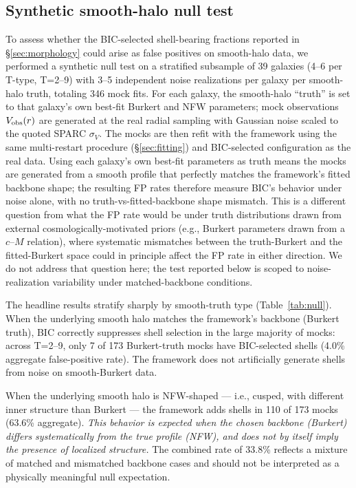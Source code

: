 \subsection{Synthetic smooth-halo null test}
\label{sec:null}

To assess whether the BIC-selected shell-bearing fractions reported in \S\ref{sec:morphology} could arise as false positives on smooth-halo data, we performed a synthetic null test on a stratified subsample of 39 galaxies (4--6 per T-type, T=2--9) with 3--5 independent noise realizations per galaxy per smooth-halo truth, totaling 346 mock fits. For each galaxy, the smooth-halo ``truth'' is set to that galaxy's own best-fit Burkert and NFW parameters; mock observations $V_{\rm obs}(r)$ are generated at the real radial sampling with Gaussian noise scaled to the quoted SPARC $\sigma_V$. The mocks are then refit with the framework using the same multi-restart procedure (\S\ref{sec:fitting}) and BIC-selected configuration as the real data. Using each galaxy's own best-fit parameters as truth means the mocks are generated from a smooth profile that perfectly matches the framework's fitted backbone shape; the resulting FP rates therefore measure BIC's behavior under noise alone, with no truth-vs-fitted-backbone shape mismatch. This is a different question from what the FP rate would be under truth distributions drawn from external cosmologically-motivated priors (e.g., Burkert parameters drawn from a $c$--$M$ relation), where systematic mismatches between the truth-Burkert and the fitted-Burkert space could in principle affect the FP rate in either direction. We do not address that question here; the test reported below is scoped to noise-realization variability under matched-backbone conditions.

The headline results stratify sharply by smooth-truth type (Table~\ref{tab:null}). When the underlying smooth halo matches the framework's backbone (Burkert truth), BIC correctly suppresses shell selection in the large majority of mocks: across T=2--9, only 7 of 173 Burkert-truth mocks have BIC-selected shells (4.0\% aggregate false-positive rate). The framework does not artificially generate shells from noise on smooth-Burkert data.

When the underlying smooth halo is NFW-shaped --- i.e., cusped, with different inner structure than Burkert --- the framework adds shells in 110 of 173 mocks (63.6\% aggregate). \emph{This behavior is expected when the chosen backbone (Burkert) differs systematically from the true profile (NFW), and does not by itself imply the presence of localized structure.} The combined rate of 33.8\% reflects a mixture of matched and mismatched backbone cases and should not be interpreted as a physically meaningful null expectation.

